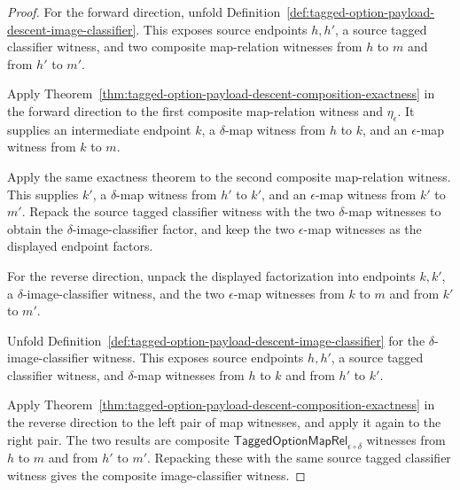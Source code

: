 \begin{proof}
For the forward direction, unfold
Definition~\ref{def:tagged-option-payload-descent-image-classifier}. This
exposes source endpoints $h,h'$, a source tagged classifier witness, and two
composite map-relation witnesses from $h$ to $m$ and from $h'$ to $m'$.

Apply Theorem~\ref{thm:tagged-option-payload-descent-composition-exactness} in
the forward direction to the first composite map-relation witness and
$\eta_{\epsilon}$. It supplies an intermediate endpoint $k$, a $\delta$-map
witness from $h$ to $k$, and an $\epsilon$-map witness from $k$ to $m$.

Apply the same exactness theorem to the second composite map-relation witness.
This supplies $k'$, a $\delta$-map witness from $h'$ to $k'$, and an
$\epsilon$-map witness from $k'$ to $m'$. Repack the source tagged classifier
witness with the two $\delta$-map witnesses to obtain the
$\delta$-image-classifier factor, and keep the two $\epsilon$-map witnesses as
the displayed endpoint factors.

For the reverse direction, unpack the displayed factorization into endpoints
$k,k'$, a $\delta$-image-classifier witness, and the two $\epsilon$-map witnesses
from $k$ to $m$ and from $k'$ to $m'$.

Unfold Definition~\ref{def:tagged-option-payload-descent-image-classifier} for
the $\delta$-image-classifier witness. This exposes source endpoints $h,h'$, a
source tagged classifier witness, and $\delta$-map witnesses from $h$ to $k$ and
from $h'$ to $k'$.

Apply Theorem~\ref{thm:tagged-option-payload-descent-composition-exactness} in
the reverse direction to the left pair of map witnesses, and apply it again to
the right pair. The two results are composite
$\mathsf{TaggedOptionMapRel}_{\epsilon\circ\delta}$ witnesses from $h$ to $m$
and from $h'$ to $m'$. Repacking these with the same source tagged classifier
witness gives the composite image-classifier witness.
\end{proof}

